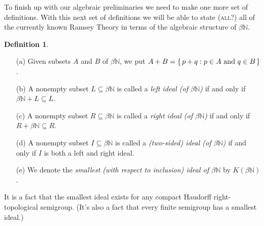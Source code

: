 \documentclass[12pt]{article}
\theoremstyle{plain}
\theoremstyle{definition}
\newtheorem{defn}[thm]{Definition}
\newcommand{\bbN}{\mathbb{N}}
\begin{document}
To finish up with our algebraic preliminaries we need to make one more
set of definitions.
With this next set of definitions we will be able to state
(\textsc{all?}) all of the currently known Ramsey Theory in terms of
the algebraic structure of $\beta\bbN$.
  \begin{defn}
    \begin{itemize}
      \item[(a)] Given subsets $A$ and $B$ of $\beta\bbN$, we put $A +
        B = \{\, p+q : \hbox{$p \in A$ and $q \in B$} \,\}$.
      \item[(b)] A nonempty subset $L \subseteq \beta\bbN$ is called a
        \textsl{left ideal (of $\beta\bbN$)} if and only if $\beta\bbN
        + L \subseteq L$.
      \item[(c)] A nonempty subset $R \subseteq \beta\bbN$ is called a
        \textsl{right ideal (of $\beta\bbN$)} if and only if $R +
        \beta\bbN \subseteq R$.
      \item[(d)] A nonempty subset $I \subseteq \beta\bbN$ is called a
        \textsl{(two-sided) ideal (of $\beta\bbN$)} if and only if $I$
        is both a left and right ideal.
      \item[(e)] We denote the \textsl{smallest (with respect to
          inclusion) ideal of $\beta\bbN$} by $K(\beta\bbN)$.
    \end{itemize}
  \end{defn}
It is a fact\cite[Theorem 2.8]{Hindman:1998fk} that the smallest ideal
exists for any compact Haudorff right-topological semigroup. 
(It's also a fact that every finite semigroup has a smallest ideal.)



\end{document}
